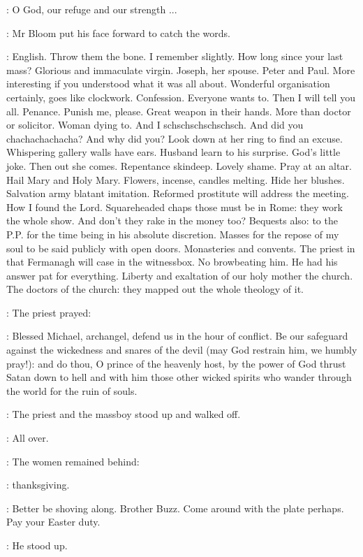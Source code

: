 \priest:
O God, our refuge and our strength ...

:
Mr Bloom put his face forward to catch the words.

\BloomInt:
English.
Throw them the bone.
I remember slightly.
How long since your last mass?
Glorious and immaculate virgin.
Joseph, her spouse.
Peter and Paul.
More interesting if you understood what it was all about.
Wonderful organisation certainly,
goes like clockwork.
Confession.
Everyone wants to.
Then I will tell you all.
Penance.
Punish me, please.
Great weapon in their hands.
More than doctor or solicitor.
Woman dying to.
And I schschschschschsch.
And did you chachachachacha?
And why did you?
Look down at her ring to find an excuse.
Whispering gallery walls have ears.
Husband learn to his surprise.
God's little joke.
Then out she comes.
Repentance skindeep.
Lovely shame.
Pray at an altar.
Hail Mary and Holy Mary.
Flowers, incense, candles melting.
Hide her blushes.
Salvation army blatant imitation.
Reformed prostitute will address the meeting.
How I found the Lord.
Squareheaded chaps those must be in Rome:
they work the whole show.
And don't they rake in the money too?
Bequests also:
to the P.P. for the time being in his absolute discretion.
Masses for the repose of my soul to be said publicly with open doors.
Monasteries and convents.
The priest in that Fermanagh will case in the witnessbox.
No browbeating him.
He had his answer pat for everything.
Liberty and exaltation of our holy mother the church.
The doctors of the church:
they mapped out the whole theology of it.

:
The priest prayed:

\priest:
Blessed Michael,
archangel,
defend us in the hour of conflict.
Be our safeguard against the wickedness and snares of the devil
(may God restrain him, we humbly pray!):
and do thou,
O prince of the heavenly host,
by the power of God
thrust Satan down to hell and with him
those other wicked spirits who wander through the world
for the ruin of souls.

:
The priest and the massboy stood up and walked off.

\BloomInt:
All over.

:
The women remained behind:

\BloomInt:
thanksgiving.

\BloomInt:
Better be shoving along.
Brother Buzz.
Come around with the plate perhaps.
Pay your Easter duty.

:
He stood up.

